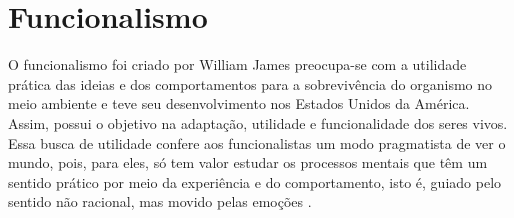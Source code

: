 \newpage
\section{Funcionalismo}\label{funcionalismo}

O funcionalismo foi criado por William James preocupa-se com a utilidade prática das ideias e dos comportamentos para a sobrevivência do organismo no meio ambiente e teve seu desenvolvimento nos Estados Unidos da América. 
Assim, possui o objetivo na adaptação, utilidade e funcionalidade dos seres vivos.
Essa busca de utilidade confere aos funcionalistas um modo pragmatista de ver o mundo, pois, para eles, só tem valor estudar os processos mentais que têm um sentido prático por meio da experiência e do comportamento, isto é, guiado pelo sentido não racional, mas movido pelas emoções \cite{silva2007psicologia_educacao}.
